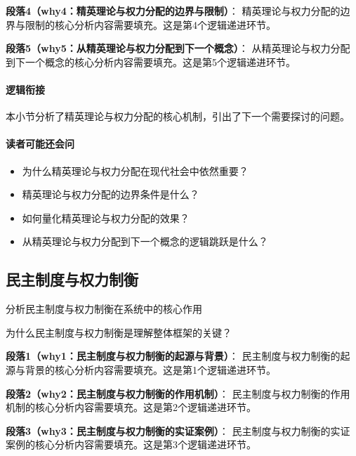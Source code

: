 \documentclass[../main.tex]{subfiles}
\begin{document}
{{\textbf{段落4（why4：精英理论与权力分配的边界与限制）}：
精英理论与权力分配的边界与限制的核心分析内容需要填充。这是第4个逻辑递进环节。


\textbf{段落5（why5：从精英理论与权力分配到下一个概念）}：
从精英理论与权力分配到下一个概念的核心分析内容需要填充。这是第5个逻辑递进环节。


\paragraph*{逻辑衔接}
本小节分析了精英理论与权力分配的核心机制，引出了下一个需要探讨的问题。

\paragraph*{读者可能还会问}
\begin{itemize}
\item 为什么精英理论与权力分配在现代社会中依然重要？
\item 精英理论与权力分配的边界条件是什么？
\item 如何量化精英理论与权力分配的效果？
\item 从精英理论与权力分配到下一个概念的逻辑跳跃是什么？
\end{itemize}


\subsection{民主制度与权力制衡}

\begin{motivation}
分析民主制度与权力制衡在系统中的核心作用
\end{motivation}

\begin{logicmap}
[逻辑链占位]
\end{logicmap}

\begin{questionbox}
为什么民主制度与权力制衡是理解整体框架的关键？
\end{questionbox}

\textbf{段落1（why1：民主制度与权力制衡的起源与背景）}：
民主制度与权力制衡的起源与背景的核心分析内容需要填充。这是第1个逻辑递进环节。


\textbf{段落2（why2：民主制度与权力制衡的作用机制）}：
民主制度与权力制衡的作用机制的核心分析内容需要填充。这是第2个逻辑递进环节。


\textbf{段落3（why3：民主制度与权力制衡的实证案例）}：
民主制度与权力制衡的实证案例的核心分析内容需要填充。这是第3个逻辑递进环节。


}}
\end{document}
